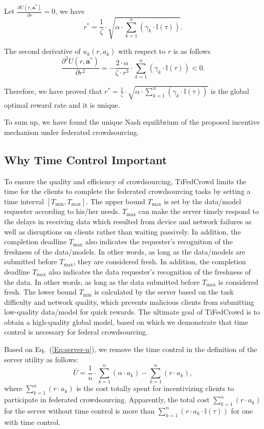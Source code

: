 \documentclass[final,1p,times]{elsarticle}
\begin{document}
Let $\frac{\partial U(r,\bm{a}^\ast)}{\partial r} = 0$, we have
\begin{equation}\label{eq:opt_r}
	r^\ast =\frac{1}{\zeta}\cdot\sqrt{\alpha\cdot\sum_{k=1}^n(\gamma_k\cdot\mathbb{I}(\tau))}.
\end{equation}	

The second derivative of $u_k(r,a_k)$ with respect to $r$ is as follows
\begin{equation}
	\frac{\partial^2 U(r,\bm{a}^\ast)}{\partial r^2} = - \frac{2\cdot\alpha}{\zeta\cdot r^3}\cdot\sum_{k=1}^n(\gamma_k\cdot\mathbb{I}(\tau)) < 0.
\end{equation}	

Therefore, we have proved that $r^\ast = \frac{1}{\zeta}\cdot\sqrt{\alpha\cdot\sum_{k=1}^n(\gamma_k\cdot\mathbb{I}(\tau))}$ is the global optimal reward rate and it is unique. 

To sum up, we have found the unique Nash equilibrium of the proposed incentive mechanism under federated crowdsourcing.

\subsection{Why Time Control Important}
To ensure the quality and efficiency of crowdsourcing, TiFedCrowd limits the time for the clients to complete the federated crowdsourcing tasks by setting a time interval $[T_{\min},T_{\max}]$. The upper bound $T_{\max}$ is set by the data/model requester according to his/her needs. $T_{\max}$ can make the server timely respond to the delays in receiving data which resulted from device and network failures as well as disruptions on clients rather than waiting passively. In addition, the completion deadline $T_{\max}$ also indicates the requester's recognition of the freshness of the data/models. In other words, as long as the data/models are submitted before $T_{\max}$, they are considered fresh. In addition, the completion deadline $T_{\max}$ also indicates the data requester's recognition of the freshness of the data. In other words, as long as the data submitted before $T_{\max}$ is considered fresh. The lower bound $T_{\min}$ is calculated by the server based on the task difficulty and network quality, which prevents malicious clients from submitting low-quality data/model for quick rewards. The ultimate goal of TiFedCrowd is to obtain a high-quality global model, based on which we demonstrate that time control is necessary for federal crowdsourcing.

Based on Eq.~(\ref{Eq:server-u}), we remove the time control in the definition of the server utility as follows: 
\begin{equation}
	\bar{U} = \frac{1}{n}\cdot \sum_{k=1}^n(\alpha\cdot a_k)  - \sum_{k=1}^n(r\cdot a_k),
\end{equation}
where $\sum_{k=1}^n(r\cdot a_k)$ is the cost totally spent for incentivizing clients to participate in federated crowdsourcing. Apparently, the total cost $\sum_{k=1}^n(r\cdot a_k)$ for the server without time control is more than $\sum_{k=1}^n(r\cdot a_k\cdot \mathbb{I}(\tau))$ for one with time control.
\end{document}

